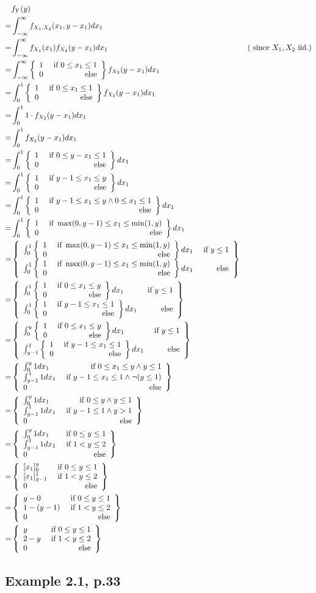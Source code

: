 \documentclass{article}
\begin{document}
\begin{align*}
	 & f_Y(y) \\
	=& \int_{-\infty}^\infty f_{X_1,X_2}(x_1,y-x_1)dx_1 \\
	=& \int_{-\infty}^\infty f_{X_1}(x_1)f_{X_2}(y-x_1)dx_1 & (\text{ since } X_1,X_2\text{ iid.}) \\
	=& \int_{-\infty}^\infty \casesii{1}{0\leq x_1 \leq 1}{0}f_{X_2}(y-x_1)dx_1 \\
	=& \int_0^1 \casesii{1}{0\leq x_1 \leq 1}{0}f_{X_2}(y-x_1)dx_1 \\
	=& \int_0^1 1\cdot f_{X_2}(y-x_1)dx_1 \\
	=& \int_0^1 f_{X_2}(y-x_1)dx_1 \\
	=& \int_0^1 \casesii{1}{0\leq y-x_1\leq 1}{0}dx_1 \\
	=& \int_0^1 \casesii{1}{y-1\leq x_1\leq y}{0}dx_1 \\
	=& \int_0^1 \casesii{1}{y-1\leq x_1\leq y\wedge 0\leq x_1 \leq 1}{0}dx_1 \\
	=& \int_0^1 \casesii{1}{\max(0,y-1)\leq x_1\leq \min(1,y)}{0}dx_1 \\
	=& \casesii{\int_0^1 \casesii{1}{\max(0,y-1)\leq x_1\leq \min(1,y)}{0}dx_1}{y \leq 1}{\int_0^1 \casesii{1}{\max(0,y-1)\leq x_1\leq \min(1,y)}{0}dx_1} \\
	=& \casesii{\int_0^1 \casesii{1}{0\leq x_1\leq y}{0}dx_1}{y \leq 1}{\int_0^1 \casesii{1}{y-1\leq x_1\leq 1}{0}dx_1} \\
	=& \casesii{\int_0^y \casesii{1}{0\leq x_1\leq y}{0}dx_1}{y \leq 1}{\int_{y-1}^1 \casesii{1}{y-1\leq x_1\leq 1}{0}dx_1} \\
	=& \casesiii{\int_0^y 1dx_1}{0\leq x_1 \leq y \wedge y\leq 1}{\int_{y-1}^1 1dx_1}{y-1\leq x_1 \leq 1 \wedge \neg(y\leq 1)}{0} \\
	=& \casesiii{\int_0^y 1dx_1}{0\leq y \wedge y\leq 1}{\int_{y-1}^1 1dx_1}{y-1\leq 1 \wedge y>1}{0} \\
	=& \casesiii{\int_0^y 1dx_1}{0\leq y\leq 1}{\int_{y-1}^1 1dx_1}{1<y\leq 2}{0} \\
	=& \casesiii{\hakparen{x_1}_0^y}{0\leq y\leq 1}{\hakparen{x_1}_{y-1}^1}{1<y\leq 2}{0} \\
	=& \casesiii{y-0}{0\leq y\leq 1}{1-(y-1)}{1<y\leq 2}{0} \\
	=& \casesiii{y}{0\leq y\leq 1}{2-y}{1<y\leq 2}{0} \\
\end{align*}

\subsection{Example 2.1, p.33}
\end{document}
